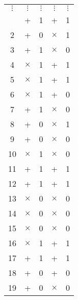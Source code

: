 \begin{longtable}{c|cc|cc}
  \endhead %
  $\vdots$ & $\vdots$                 & $\vdots$                & $\vdots$ & $\vdots$ \\
  \endfoot %
  \endlastfoot
  1      & +                          & 1                       & +        & 1   \\
  2      & +                          & 0                       & $\times$ & 1   \\
  3      & +                          & 1                       & $\times$ & 0   \\
  4      & $\times$                   & 1                       & +        & 1   \\
  5      & $\times$                   & 1                       & +        & 1   \\
  6      & $\times$                   & 1                       & +        & 0   \\
  7      & +                          & 1                       & $\times$ & 0   \\
  8      & +                          & 0                       & $\times$ & 1   \\
  9      & +                          & 0                       & $\times$ & 0   \\
  10     & $\times$                   & 1                       & $\times$ & 0   \\
  11     & +                          & 1                       & +        & 1   \\
  12     & +                          & 1                       & +        & 1   \\
  13     & $\times$                   & 0                       & $\times$ & 0   \\
  14     & $\times$                   & 0                       & $\times$ & 0   \\
  15     & $\times$                   & 0                       & $\times$ & 0   \\
  16     & $\times$                   & 1                       & +        & 1   \\
  17     & +                          & 1                       & +        & 1   \\
  18     & +                          & 0                       & +        & 0   \\
  19     & +                          & 0                       & $\times$ & 0   \\

\end{longtable}
